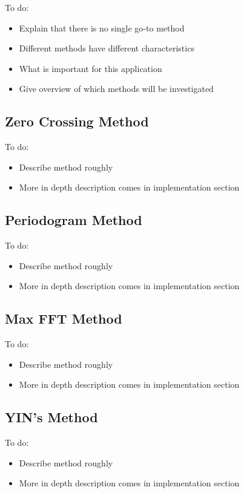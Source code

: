 \color{red}
To do:
\begin{itemize}
	\item Explain that there is no single go-to method
	\item Different methods have different characteristics
	\item What is important for this application
	\item Give overview of which methods will be investigated
\end{itemize}
\color{black}

\subsection{Zero Crossing Method}

\color{red}
To do:
\begin{itemize}
	\item Describe method roughly
	\item More in depth description comes in implementation section
\end{itemize}
\color{black}

\subsection{Periodogram Method}

\color{red}
To do:
\begin{itemize}
	\item Describe method roughly
	\item More in depth description comes in implementation section
\end{itemize}
\color{black}

\subsection{Max FFT Method}

\color{red}
To do:
\begin{itemize}
	\item Describe method roughly
	\item More in depth description comes in implementation section
\end{itemize}
\color{black}

\subsection{YIN's Method}

\color{red}
To do:
\begin{itemize}
	\item Describe method roughly
	\item More in depth description comes in implementation section
\end{itemize}
\color{black}

